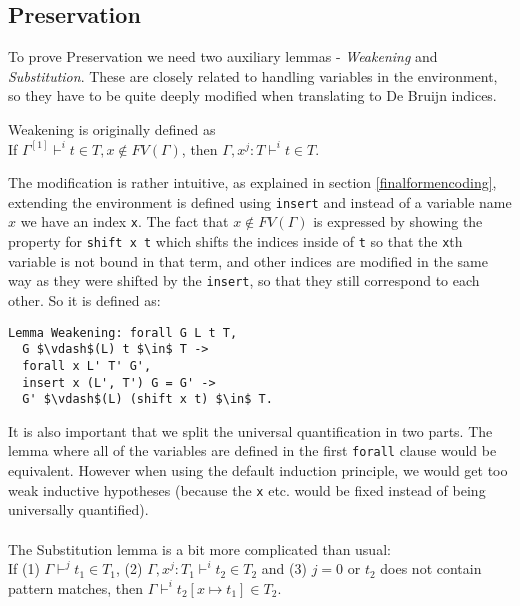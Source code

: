 \documentclass[runningheads]{article}
\begin{document}
\subsection{Preservation}

To prove Preservation we need two auxiliary lemmas - \textit{Weakening} and \textit{Substitution}. These are closely related to handling variables in the environment, so they have to be quite deeply modified when translating to De Bruijn indices.

Weakening is originally defined as 
\\
If $\Gamma^{[1]} \vdash^i t \in T, x \not\in FV(\Gamma)$, then $\Gamma, x^j : T \vdash^i t \in T$.

The modification is rather intuitive, as explained in section \ref{finalformencoding}, extending the environment is defined using \verb|insert| and instead of a variable name $x$ we have an index \verb|x|. The fact that $x \not\in FV(\Gamma)$ is expressed by showing the property for \verb|shift x t| which shifts the indices inside of \verb|t| so that the \verb|x|th variable is not bound in that term, and other indices are modified in the same way as they were shifted by the \verb|insert|, so that they still correspond to each other. So it is defined as:
\begin{lstlisting}[mathescape=true]
Lemma Weakening: forall G L t T,
  G $\vdash$(L) t $\in$ T ->
  forall x L' T' G',
  insert x (L', T') G = G' ->
  G' $\vdash$(L) (shift x t) $\in$ T.
\end{lstlisting}
It is also important that we split the universal quantification in two parts. The lemma where all of the variables are defined in the first \verb|forall| clause would be equivalent. However when using the default induction principle, we would get too weak inductive hypotheses (because the \verb|x| etc. would be fixed instead of being universally quantified).

\paragraph{}

The Substitution lemma is a bit more complicated than usual:
\\
If (1) $\Gamma \vdash^j t_1 \in T_1$, (2) $\Gamma, x^j : T_1 \vdash^i t_2 \in T_2$ and
(3) $j = 0$ or $t_2$ does not contain pattern matches, then $\Gamma \vdash^i t_2[x \mapsto t_1] \in T_2$.
\end{document}
